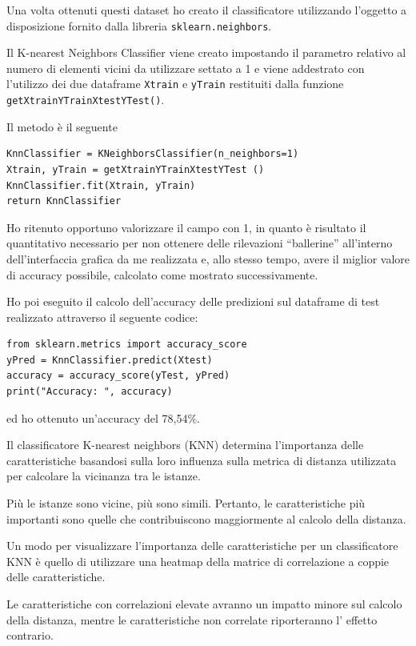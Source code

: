 Una volta ottenuti questi dataset ho creato il classificatore utilizzando l’oggetto a disposizione fornito dalla libreria \texttt{sklearn.neighbors}.

Il K-nearest Neighbors Classifier viene creato impostando il parametro relativo al numero di elementi vicini da utilizzare settato a 1 e viene addestrato con l’utilizzo dei due dataframe \texttt{Xtrain} e \texttt{yTrain} restituiti dalla funzione \texttt{getXtrainYTrainXtestYTest()}.

Il metodo è il seguente
\begin{verbatim}
KnnClassifier = KNeighborsClassifier(n_neighbors=1)
Xtrain, yTrain = getXtrainYTrainXtestYTest ()
KnnClassifier.fit(Xtrain, yTrain)
return KnnClassifier
\end{verbatim}

Ho ritenuto opportuno valorizzare il campo con 1, in quanto è risultato il quantitativo necessario per non ottenere delle rilevazioni “ballerine” all’interno dell’interfaccia grafica da me realizzata e, allo stesso tempo, avere il miglior valore di accuracy possibile, calcolato come mostrato successivamente.

Ho poi eseguito il calcolo dell’accuracy delle predizioni sul dataframe di test realizzato attraverso il seguente codice:
\begin{verbatim}
from sklearn.metrics import accuracy_score
yPred = KnnClassifier.predict(Xtest)
accuracy = accuracy_score(yTest, yPred)
print("Accuracy: ", accuracy)
\end{verbatim}

ed ho ottenuto un'accuracy del 78,54\%.

Il classificatore K-nearest neighbors (KNN) determina l'importanza delle caratteristiche basandosi sulla loro influenza sulla metrica di distanza utilizzata per calcolare la vicinanza tra le istanze. 

Più le istanze sono vicine, più sono simili. Pertanto, le caratteristiche più importanti sono quelle che contribuiscono maggiormente al calcolo della distanza.

Un modo per visualizzare l'importanza delle caratteristiche per un classificatore KNN è quello di utilizzare una heatmap della matrice di correlazione a coppie delle caratteristiche. 

Le caratteristiche con correlazioni elevate avranno un impatto minore sul calcolo della distanza, mentre le caratteristiche non correlate riporteranno l' effetto contrario.

